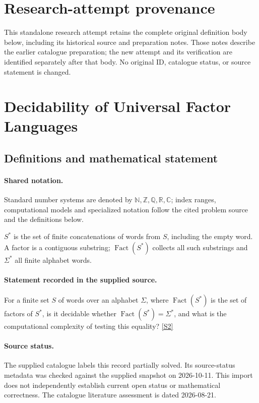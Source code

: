 \documentclass[11pt]{article}
\begin{document}
\section*{Research-attempt provenance}
This standalone research attempt retains the complete original definition body below,
including its historical source and preparation notes. Those notes describe the
earlier catalogue preparation; the new attempt and its verification are identified
separately after that body. No original ID, catalogue status, or source statement is changed.

\section{Decidability of Universal Factor Languages}\label{statement}

\subsection{Definitions and mathematical statement}

\paragraph{Shared notation.}Standard number systems are denoted by $\mathbb N,\mathbb Z,\mathbb Q,\mathbb R,\mathbb C$; index ranges, computational models and specialized notation follow the cited problem source and the definitions below.


$S^*$ is the set of finite concatenations of words from $S$, including the empty word. A factor is a contiguous substring; $\operatorname{Fact}(S^*)$ collects all such substrings and $\Sigma^*$ all finite alphabet words.
\paragraph{Statement recorded in the supplied source.}
For a finite set $S$ of words over an alphabet $\Sigma$, where $\operatorname{Fact}(S^*)$ is the set of factors of $S^*$, is it decidable whether $\operatorname{Fact}(S^*)=\Sigma^*$, and what is the computational complexity of testing this equality? \href{https://doi.org/10.4171/owr/2010/37}{[S2]}
\paragraph{Source status.}
The supplied catalogue labels this record partially solved. Its source-status metadata was checked against the supplied snapshot on 2026-10-11. This import does not independently establish current open status or mathematical correctness. The catalogue literature assessment is dated 2026-08-21.
\end{document}
